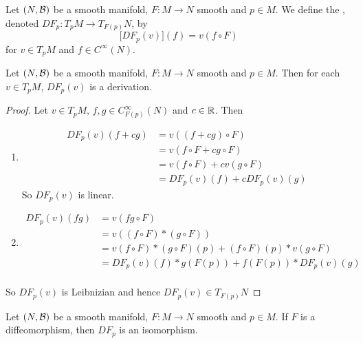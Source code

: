 \documentclass{book}
\begin{document}
	\begin{defn}
		Let $(N, \mathcal{B})$ be a smooth manifold, $F: M \rightarrow N$ smooth and $p \in M$. We define the , denoted $DF_p: T_pM \rightarrow T_{F(p)}N$, by $$\bigg[ DF_p(v) \bigg] (f) = v (f \circ F)$$  for $v \in T_pM$ and $f \in C^{\infty}(N)$.
	\end{defn}
	
	
	
	
	\begin{ex}
	Let $(N, \mathcal{B})$ be a smooth manifold, $F: M \rightarrow N$ smooth and $p \in M$. Then for each $v \in T_pM$, $DF_p(v)$ is a derivation.
	\end{ex}
	
	\begin{proof}
	Let $v \in T_pM$, $f,g \in C_{F(p)}^{\infty}(N)$ and $c \in \mathbb{R}$. Then 
	\begin{enumerate}
	\item 
	\begin{align*}
		DF_p(v)(f+cg) 
		&= v((f+cg) \circ F) \\
		&= v(f \circ F + c g \circ F) \\
		&= v(f \circ F) + cv(g \circ F) \\
		&= DF_p(v)(f) + c DF_p(v)(g)
	\end{align*}
	So $DF_p(v)$ is linear.
	\item 
	\begin{align*}
	DF_p(v)(fg) 
	&= v (fg \circ F) \\
	&= v((f \circ F)* (g \circ F)) \\
	&= v(f \circ F)*(g \circ F)(p) +  (f \circ F)(p)* v(g \circ F) \\
	&= DF_p(v)(f) * g(F(p)) + f(F(p))*DF_p(v)(g) \\
	\end{align*}
	\end{enumerate}
	So $DF_p(v)$ is Leibnizian and hence $DF_p(v) \in T_{F(p)}N$
	\end{proof}

	\begin{ex}
		Let $(N, \mathcal{B})$ be a smooth manifold, $F: M \rightarrow N$ smooth and $p \in M$. If $F$ is a diffeomorphism, then $DF_p$ is an isomorphism.
	\end{ex}
	
\end{document}
